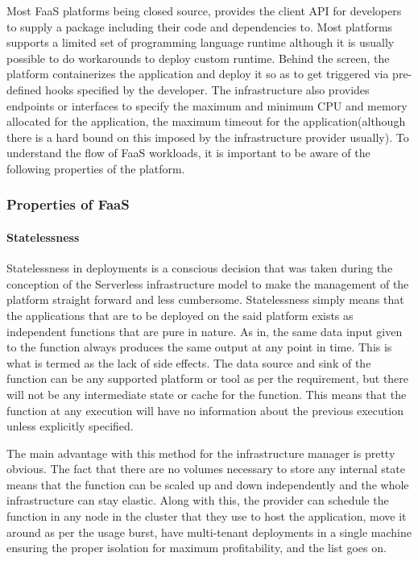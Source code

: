 \documentclass[12pt,titlepage]{article}
\begin{document}
Most FaaS platforms being closed source, provides the client API for developers
to supply a package including their code and dependencies to. Most platforms
supports a limited set of programming language runtime although it is usually
possible to do workarounds to deploy custom runtime. Behind the screen,
the platform containerizes the application and deploy it so as to get triggered
via pre-defined hooks specified by the developer. The infrastructure also provides endpoints or
interfaces to specify the maximum and minimum CPU and memory allocated for the
application, the maximum timeout for the application(although there is a
hard bound on this imposed by the infrastructure provider usually). To
understand the flow of FaaS workloads, it is important to be aware of the
following properties of the platform.

\subsubsection{Properties of FaaS}
\label{sec:orgf825e17}
\paragraph{Statelessness}
\label{sec:org9da52ea}
Statelessness in deployments is a conscious decision that was taken during the
conception of the Serverless infrastructure model to make the management of the
platform straight forward and less cumbersome. Statelessness simply means that
the applications that are to be deployed on the said platform exists as
independent functions that are pure in nature. As in, the same data input given
to the function always produces the same output at any point in time. This is
what is termed as the lack of side effects. The data source and sink of
the function can be any supported platform or tool as per the requirement, but
there will not be any intermediate state or cache for the function. This means that
the function at any execution will have no information about the previous
execution unless explicitly specified.

The main advantage with this method for the infrastructure manager is pretty
obvious. The fact that there are no volumes necessary to store any internal
state means that the function can be scaled up and down independently and the
whole infrastructure can stay elastic. Along with this, the provider can
schedule the function in any node in the cluster that they use to host the
application, move it around as per the usage burst, have multi-tenant
deployments in a single machine ensuring the proper isolation for maximum
profitability, and the list goes on.
\end{document}
